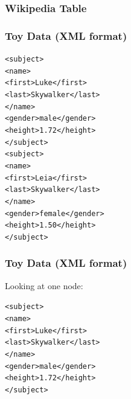 \documentclass[12pt]{beamer}\usepackage[]{graphicx}\usepackage[]{color}
\makeatletter
\newenvironment{kframe}{%
 \def\at@end@of@kframe{}%
 \ifinner\ifhmode%
  \def\at@end@of@kframe{\end{minipage}}%
  \begin{minipage}{\columnwidth}%
 \fi\fi%
 \def\FrameCommand##1{\hskip\@totalleftmargin \hskip-\fboxsep
 \colorbox{shadecolor}{##1}\hskip-\fboxsep
     \hskip-\linewidth \hskip-\@totalleftmargin \hskip\columnwidth}%
 \MakeFramed {\advance\hsize-\width
   \@totalleftmargin\z@ \linewidth\hsize
   \@setminipage}}%
 {\par\unskip\endMakeFramed%
 \at@end@of@kframe}
\newenvironment{knitrout}{}{} %
\makeatother
\begin{document}

\begin{frame}[fragile]
\frametitle{Wikipedia Table}
\begin{center}
\end{center}
\end{frame}


\begin{frame}
\begin{center}
\Huge{}
\end{center}
\end{frame}


\begin{frame}[fragile]
\frametitle{Toy Data (XML format)}

\begin{knitrout}\footnotesize
{}\color{fgcolor}\begin{kframe}
\begin{alltt}
<subject>
  <name>
    <first>Luke</first>
    <last>Skywalker</last>
  </name>
  <gender>male</gender>
  <height>1.72</height>
</subject>
<subject>
  <name>
    <first>Leia</first>
    <last>Skywalker</last>
  </name>
  <gender>female</gender>
  <height>1.50</height>
</subject>
\end{alltt}
\end{kframe}
\end{knitrout}

\end{frame}


\begin{frame}[fragile]
\frametitle{Toy Data (XML format)}

Looking at one {\hilit {}} node:
\begin{knitrout}\footnotesize
{}\color{fgcolor}\begin{kframe}
\begin{alltt}
<subject>
  <name>
    <first>Luke</first>
    <last>Skywalker</last>
  </name>
  <gender>male</gender>
  <height>1.72</height>
</subject>
\end{alltt}
\end{kframe}
\end{knitrout}

\end{frame}
\end{document}

